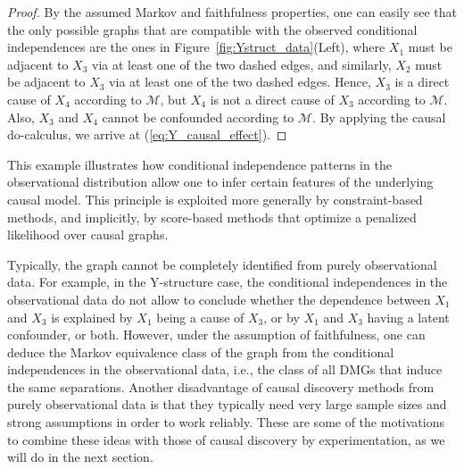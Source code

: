 \documentclass[twoside,11pt]{article}
\DeclareMathOperator*{\nCI}{{\,\not\mkern-1mu\perp\mkern-12mu\perp\,}}
\newcommand{\Prb}{\mathbb{P}}
\newcommand\C[1]{\mathcal{#1}}
\newcommand\given{\,|\,}
\newcommand\eref[1]{(\ref{#1})}
\newcommand{\oto}{\leftrightarrow}
\newcommand{\intervene}{\mathrm{do}}
\begin{document}
\begin{proof}
By the assumed Markov and faithfulness properties, one
can easily see that the only possible graphs that are compatible with the observed
conditional independences are the ones in Figure~\ref{fig:Ystruct_data}(Left),
where $X_1$ must be adjacent to $X_3$ via at least one of the two dashed edges, and similarly,
$X_2$ must be adjacent to $X_3$ via at least one of the two dashed edges. Hence, $X_3$ is a 
direct cause of $X_4$ according to $\C{M}$, but $X_4$ is not a direct
cause of $X_3$ according to $\C{M}$. Also, $X_3$ and $X_4$ cannot be confounded
according to $\C{M}$.
By applying the causal do-calculus, we arrive at \eref{eq:Y_causal_effect}.
\end{proof}
This example illustrates how conditional independence patterns in the observational
distribution allow one to infer certain features of the underlying causal model. This
principle is exploited more generally by constraint-based methods, and implicitly,
by score-based methods that optimize a penalized likelihood over causal graphs.

Typically, the graph cannot be completely identified from purely observational data.
For example, in the Y-structure case, the conditional independences in the observational data
do not allow to conclude whether the dependence between $X_1$ and $X_3$ is explained by
$X_1$ being a cause of $X_3$, or by $X_1$ and $X_3$ having a latent confounder,
or both.
However, under the assumption of faithfulness, one can deduce the Markov
equivalence class of the graph from the conditional independences in the observational data, 
i.e., the class of all DMGs that induce the same separations.
Another disadvantage of causal discovery methods from purely observational data is that
they typically need very large sample sizes and strong assumptions in order to work reliably.
These are some of the motivations to combine these ideas with those of causal discovery by
experimentation, as we will do in the next section.
\end{document}
